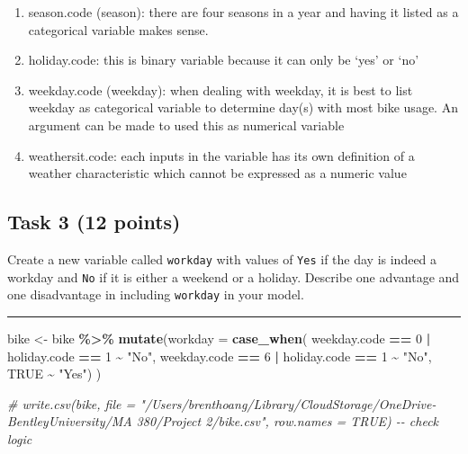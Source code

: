 \documentclass[
]{article}
\newenvironment{Shaded}{\begin{snugshade}}{\end{snugshade}}
\newcommand{\AttributeTok}[1]{\textcolor[rgb]{0.13,0.29,0.53}{#1}}
\newcommand{\CommentTok}[1]{\textcolor[rgb]{0.56,0.35,0.01}{\textit{#1}}}
\newcommand{\ConstantTok}[1]{\textcolor[rgb]{0.56,0.35,0.01}{#1}}
\newcommand{\DecValTok}[1]{\textcolor[rgb]{0.00,0.00,0.81}{#1}}
\newcommand{\FunctionTok}[1]{\textcolor[rgb]{0.13,0.29,0.53}{\textbf{#1}}}
\newcommand{\NormalTok}[1]{#1}
\newcommand{\OtherTok}[1]{\textcolor[rgb]{0.56,0.35,0.01}{#1}}
\newcommand{\SpecialCharTok}[1]{\textcolor[rgb]{0.81,0.36,0.00}{\textbf{#1}}}
\newcommand{\StringTok}[1]{\textcolor[rgb]{0.31,0.60,0.02}{#1}}
\providecommand{\tightlist}{%
  \setlength{\itemsep}{0pt}\setlength{\parskip}{0pt}}
\begin{document}
\begin{enumerate}
\def\labelenumi{\arabic{enumi}.}
\tightlist
\item
  season.code (season): there are four seasons in a year and having it
  listed as a categorical variable makes sense.
\item
  holiday.code: this is binary variable because it can only be `yes' or
  `no'
\item
  weekday.code (weekday): when dealing with weekday, it is best to list
  weekday as categorical variable to determine day(s) with most bike
  usage. An argument can be made to used this as numerical variable
\item
  weathersit.code: each inputs in the variable has its own definition of
  a weather characteristic which cannot be expressed as a numeric value
\end{enumerate}

\hypertarget{task-3-12-points}{%
\subsection{Task 3 (12 points)}\label{task-3-12-points}}

Create a new variable called \texttt{workday} with values of
\texttt{Yes} if the day is indeed a workday and \texttt{No} if it is
either a weekend or a holiday. Describe one advantage and one
disadvantage in including \texttt{workday} in your model.

\begin{center}\rule{0.5\linewidth}{0.5pt}\end{center}

\begin{Shaded}
\begin{Highlighting}[]
\NormalTok{bike }\OtherTok{\textless{}{-}}\NormalTok{ bike }\SpecialCharTok{\%\textgreater{}\%}
  \FunctionTok{mutate}\NormalTok{(}\AttributeTok{workday =} \FunctionTok{case\_when}\NormalTok{(}
\NormalTok{    weekday.code }\SpecialCharTok{==} \DecValTok{0} \SpecialCharTok{|}\NormalTok{ holiday.code }\SpecialCharTok{==} \DecValTok{1} \SpecialCharTok{\textasciitilde{}} \StringTok{"No"}\NormalTok{,}
\NormalTok{    weekday.code }\SpecialCharTok{==} \DecValTok{6} \SpecialCharTok{|}\NormalTok{ holiday.code }\SpecialCharTok{==} \DecValTok{1} \SpecialCharTok{\textasciitilde{}} \StringTok{"No"}\NormalTok{, }
    \ConstantTok{TRUE} \SpecialCharTok{\textasciitilde{}} \StringTok{"Yes"}\NormalTok{)}
\NormalTok{    )}

\CommentTok{\# write.csv(bike, file = "/Users/brenthoang/Library/CloudStorage/OneDrive{-}BentleyUniversity/MA 380/Project 2/bike.csv", row.names = TRUE) {-}{-} check logic  }
\end{Highlighting}
\end{Shaded}
\end{document}
